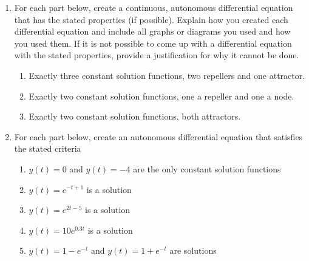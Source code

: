 \begin{enumerate}

\item For each part below, create a continuous, autonomous differential equation that has the stated properties (if possible). Explain how you created each differential equation and include all graphs or diagrams you used and how you used them. If it is not possible to come up with a differential equation with the stated properties, provide a justification for why it cannot be done. \label{04HWproblem3}

\begin{enumerate}
\item Exactly three constant solution functions, two repellers and one attractor.
\item	Exactly two constant solution functions, one a repeller and one a node.
\item	Exactly two constant solution functions, both attractors.
\end{enumerate}

\item For each part below, create an autonomous differential equation that satisfies the stated criteria \label{04HWproblem4}
\begin{enumerate}
\item	$y(t)=0$ and $y(t) = -4$ are the only constant solution functions
\item $y(t)=e^{-t+1}$ is a solution
\item $y(t)=e^{2t-5}$	is a solution
\item $y(t)=10e^{0.3t}$ is a solution
\item $y(t)=1-e^{-t}$ and $y(t)=1+e^{-t}$ are solutions
\end{enumerate}


\end{enumerate}
